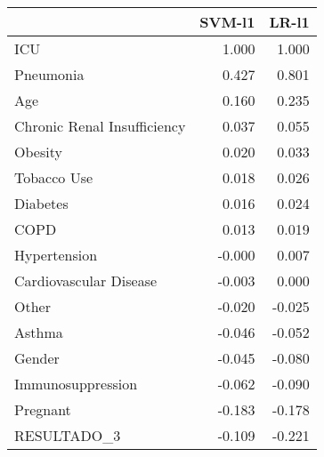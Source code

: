 \begin{tabular}{lrr}
\toprule
{} &  SVM-l1 &  LR-l1 \\
\midrule
ICU                         &   1.000 &  1.000 \\
Pneumonia                   &   0.427 &  0.801 \\
Age                         &   0.160 &  0.235 \\
Chronic Renal Insufficiency &   0.037 &  0.055 \\
Obesity                     &   0.020 &  0.033 \\
Tobacco Use                 &   0.018 &  0.026 \\
Diabetes                    &   0.016 &  0.024 \\
COPD                        &   0.013 &  0.019 \\
Hypertension                &  -0.000 &  0.007 \\
Cardiovascular Disease      &  -0.003 &  0.000 \\
Other                       &  -0.020 & -0.025 \\
Asthma                      &  -0.046 & -0.052 \\
Gender                      &  -0.045 & -0.080 \\
Immunosuppression           &  -0.062 & -0.090 \\
Pregnant                    &  -0.183 & -0.178 \\
RESULTADO\_3                 &  -0.109 & -0.221 \\
\bottomrule
\end{tabular}
